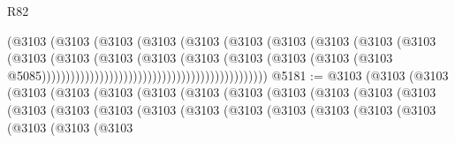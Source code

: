 \begin{lexlean}{R82}
\begin{coremodule}
                                                            (@3103
                                                              (@3103
                                                                (@3103
                                                                  (@3103
                                                                    (@3103
                                                                      (@3103
                                                                        (@3103
                                                                          (@3103
                                                                            (@3103
                                                                              (@3103
                                                                                (@3103
                                                                                  (@3103
                                                                                    (@3103
                                                                                      (@3103
                                                                                        (@3103
                                                                                          (@3103
                                                                                            (@3103
                                                                                              (@3103
                                                                                                (@3103
                                                                                                  @5085)))))))))))))))))))))))))))))))))))))))))))))))
@5181 := @3103
    (@3103
      (@3103
        (@3103
          (@3103
            (@3103
              (@3103
                (@3103
                  (@3103
                    (@3103
                      (@3103
                        (@3103
                          (@3103
                            (@3103
                              (@3103
                                (@3103
                                  (@3103
                                    (@3103
                                      (@3103
                                        (@3103
                                          (@3103
                                            (@3103
                                              (@3103
                                                (@3103
                                                  (@3103
                                                    (@3103

\end{coremodule}
\end{lexlean}
